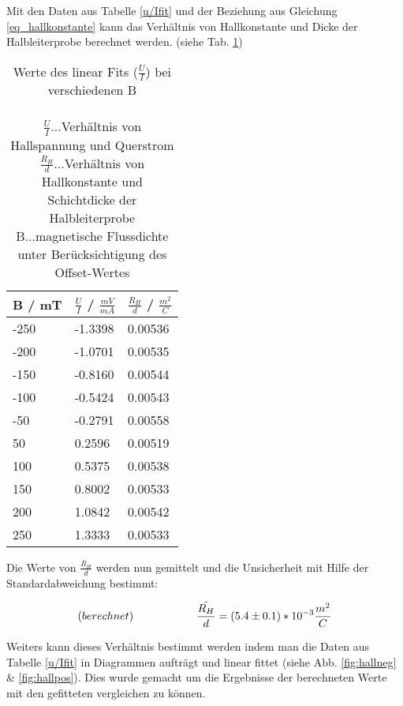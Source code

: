 \documentclass[12pt, a4paper]{article}
\begin{document}
\newpage
Mit den Daten aus Tabelle \ref{u/Ifit} und der Beziehung aus Gleichung \ref{eq_hallkonstante} kann das Verhältnis von Hallkonstante und Dicke der Halbleiterprobe berechnet werden. (siehe Tab. \ref{R/d})

\begin{table}[!htbp]
\caption{Werte des linear Fits ($\frac{U}{I}$) bei verschiedenen B\\\\
$\frac{U}{I}$...Verhältnis von Hallspannung und Querstrom\\
$\frac{R_H}{d}$...Verhältnis von Hallkonstante und Schichtdicke der Halbleiterprobe\\
B...magnetische Flussdichte unter Berücksichtigung des Offset-Wertes\\}
\label{R/d}
\begin{tabular}{|l|l|l|}
\hline
B / mT & $\frac{U}{I}$ / $\frac{mV}{mA}$ &$\frac{R_H}{d}$ / $\frac{m^2}{C}$             \\ \hline
-250 & -1.3398 & 0.00536 \\\hline
-200 & -1.0701 & 0.00535\\\hline
-150 & -0.8160 & 0.00544\\\hline
-100 & -0.5424 & 0.00543\\\hline
-50 & -0.2791 & 0.00558\\\hline
50 & 0.2596 & 0.00519\\\hline
100 & 0.5375 & 0.00538\\\hline
150 & 0.8002 & 0.00533\\\hline
200 & 1.0842 & 0.00542\\\hline
250 & 1.3333 & 0.00533\\\hline
\end{tabular}
\end{table}

Die Werte von $\frac{R_H}{d}$ werden nun gemittelt und die Unsicherheit mit Hilfe der Standardabweichung bestimmt:

\begin{equation*}
   (berechnet) \hspace{2.0cm} \Bar{\frac{R_H}{d}} = (5.4 \pm 0.1) *10^{-3} \frac{m^2}{C} 
\end{equation*}


Weiters kann dieses Verhältnis bestimmt werden indem man die Daten aus Tabelle \ref{u/Ifit} in Diagrammen aufträgt und linear fittet (siehe Abb. \ref{fig:hallneg} $\&$ \ref{fig:hallpos}). Dies wurde gemacht um die Ergebnisse der berechneten Werte mit den gefitteten vergleichen zu können.
\end{document}
